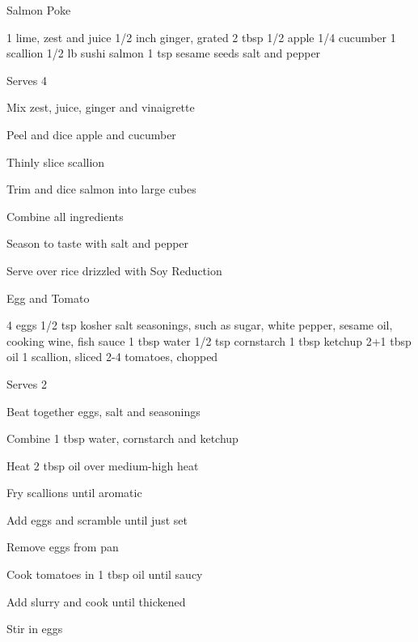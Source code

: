 
\begin{recipe}{Salmon Poke}{}
\begin{ingredients}
1 lime, zest and juice
1/2 inch ginger, grated
2 tbsp 
1/2 apple
1/4 cucumber
1 scallion
1/2 lb sushi salmon
1 tsp sesame seeds
salt and pepper
\end{ingredients}
\nextcolumn
Serves 4
\begin{steps}
    \item Mix zest, juice, ginger and vinaigrette
    \item Peel and dice apple and cucumber
    \item Thinly slice scallion
    \item Trim and dice salmon into large cubes
    \item Combine all ingredients
    \item Season to taste with salt and pepper
\end{steps}
Serve over rice drizzled with Soy Reduction
\end{recipe}

\begin{denserecipe}{Egg and Tomato}{}
\begin{ingredients}
4 eggs
1/2 tsp kosher salt
seasonings, such as sugar, white pepper, sesame oil, cooking wine, fish sauce
1 tbsp water
1/2 tsp cornstarch
1 tbsp ketchup
2+1 tbsp oil
1 scallion, sliced
2-4 tomatoes, chopped
\end{ingredients}
\nextcolumn
Serves 2
\begin{steps}
    \item Beat together eggs, salt and seasonings
    \item Combine 1 tbsp water, cornstarch and ketchup
    \item Heat 2 tbsp oil over medium-high heat
    \item Fry scallions until aromatic
    \item Add eggs and scramble until just set
    \item Remove eggs from pan
    \item Cook tomatoes in 1 tbsp oil until saucy
    \item Add slurry and cook until thickened
    \item Stir in eggs
\end{steps}
\end{denserecipe}

